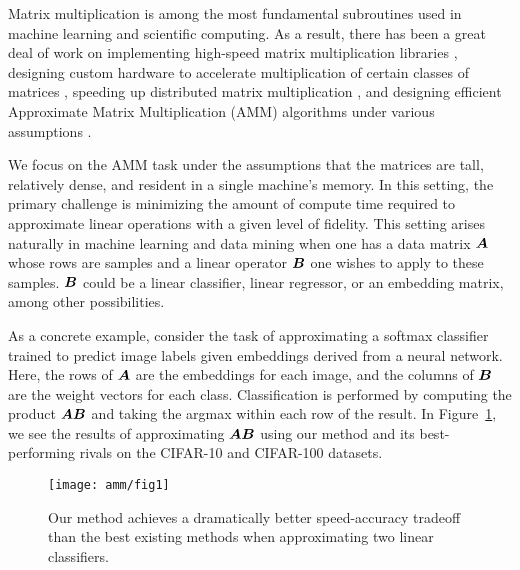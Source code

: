 
Matrix multiplication is among the most fundamental subroutines used in machine learning and scientific computing. As a result, there has been a great deal of work on implementing high-speed matrix multiplication libraries \cite{pytorch,eigen,tensorflow}, designing custom hardware to accelerate multiplication of certain classes of matrices \cite{eie,eyeriss,scnn,tpu},
speeding up distributed matrix multiplication \cite{distributedCoded, shortDot, entangledPolynomial, matmulCommunicationBounds},
and designing efficient Approximate Matrix Multiplication (AMM) algorithms under various assumptions%
.

We focus on the AMM task under the assumptions that the matrices are tall, relatively dense, and resident in a single machine's memory. In this setting, the primary challenge is minimizing the amount of compute time required to approximate linear operations with a given level of fidelity.
This setting arises naturally in machine learning and data mining when one has a data matrix $\bm{A}$ whose rows are samples and a linear operator $\bm{B}$ one wishes to apply to these samples. $\bm{B}$ could be a linear classifier, linear regressor, or an embedding matrix, among other possibilities.

As a concrete example, consider the task of approximating a softmax classifier trained to predict image labels given embeddings derived from a neural network. Here, the rows of $\bm{A}$ are the embeddings for each image, and the columns of $\bm{B}$ are the weight vectors for each class. Classification is performed by computing the product $\bm{A}\bm{B}$ and taking the argmax within each row of the result.
In Figure~\ref{fig:fig1}, we see the results of approximating $\bm{A}\bm{B}$ using our method and its best-performing rivals \cite{hashjl, sparsePCA} on the CIFAR-10 and CIFAR-100 datasets.
\vspace{1mm}
\begin{figure}[h]
\begin{center}
\texttt{[image: amm/fig1]}
\caption{Our method achieves a dramatically better speed-accuracy tradeoff than the best existing methods when approximating two linear classifiers.}
\label{fig:fig1}
\end{center}
\end{figure}
\vspace{-1mm}

